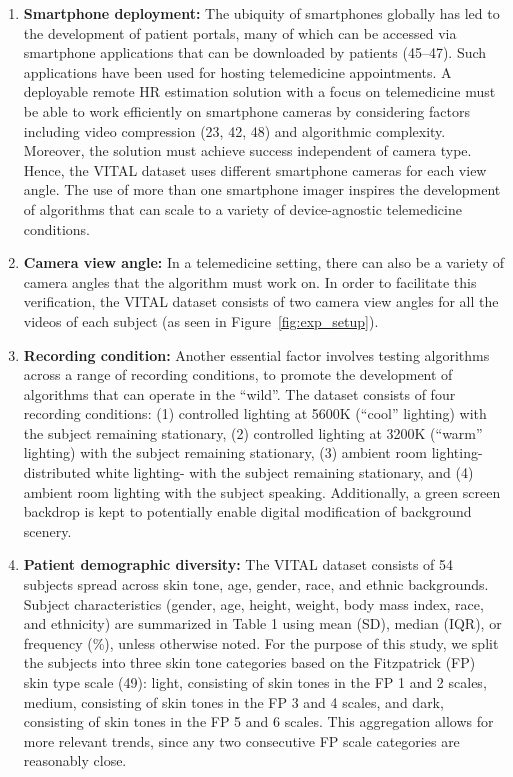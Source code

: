 \begin{enumerate}[label=(\roman*)]
    \item \textbf{Smartphone deployment:} The ubiquity of smartphones globally has led to the development of patient portals, many of which can be accessed via smartphone applications that can be downloaded by patients (45–47). Such applications have been used for hosting telemedicine appointments. A deployable remote HR estimation solution with a focus on telemedicine must be able to work efficiently on smartphone cameras by considering factors including video compression (23, 42, 48) and algorithmic complexity. Moreover, the solution must achieve success independent of camera type. Hence, the VITAL dataset uses different smartphone cameras for each view angle. The use of more than one smartphone imager inspires the development of algorithms that can scale to a variety of device-agnostic telemedicine conditions. 
    \item \textbf{Camera view angle:} In a telemedicine setting, there can also be a variety of camera angles that the algorithm must work on. In order to facilitate this verification, the VITAL dataset consists of two camera view angles for all the videos of each subject (as seen in Figure~\ref{fig:exp_setup}).
    \item \textbf{Recording condition:} Another essential factor involves testing algorithms across a range of recording conditions, to promote the development of algorithms that can operate in the “wild”. The dataset consists of four recording conditions: (1) controlled lighting at 5600K (“cool” lighting) with the subject remaining stationary, (2) controlled lighting at 3200K (“warm” lighting) with the subject remaining stationary, (3) ambient room lighting- distributed white lighting- with the subject remaining stationary, and (4) ambient room lighting with the subject speaking. Additionally, a green screen backdrop is kept to potentially enable digital modification of background scenery.
    \item \textbf{Patient demographic diversity:} The VITAL dataset consists of 54 subjects spread across skin tone, age, gender, race, and ethnic backgrounds. Subject characteristics (gender, age, height, weight, body mass index, race, and ethnicity) are summarized in Table 1 using mean (SD), median (IQR), or frequency (\%), unless otherwise noted. For the purpose of this study, we split the subjects into three skin tone categories based on the Fitzpatrick (FP) skin type scale (49): light, consisting of skin tones in the FP 1 and 2 scales, medium, consisting of skin tones in the FP 3 and 4 scales, and dark, consisting of skin tones in the FP 5 and 6 scales. This aggregation allows for more relevant trends, since any two consecutive FP scale categories are reasonably close.
\end{enumerate}

